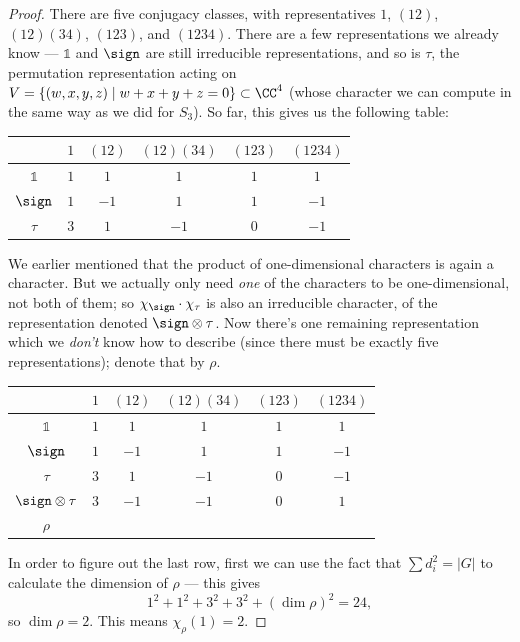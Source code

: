 \begin{proof}
There are five conjugacy classes, with representatives $1$, $(12)$, $(12)(34)$, $(123)$, and $(1234)$. There are a few representations we already know --- $\mathds{1}$ and $\sign$ are still irreducible representations, and so is $\tau$, the permutation representation acting on  $V = \{(w, x, y, z) \mid w + x + y + z = 0\} \subset \CC^4$ (whose character we can compute in the same way as we did for $S_3$). So far, this gives us the following table: 
\begin{center}
    \begin{tabular}{c||c|c|c|c|c}
    & $1$ & $(12)$ & $(12)(34)$ & $(123)$ & $(1234)$ \\
    \hline 
    \hline 
    $\mathds{1}$ & $1$ & $1$ & $1$ & $1$ & $1$ \\ 
    \hline 
    $\sign$ & $1$ & $-1$ & $1$ & $1$ & $-1$ \\
    \hline 
    $\tau$ & $3$ & $1$ & $-1$ & $0$ & $-1$
    \end{tabular}
\end{center}
We earlier mentioned that the product of one-dimensional characters is again a character. But we actually only need \emph{one} of the characters to be one-dimensional, not both of them; so $\chi_{\sign}\cdot \chi_{\tau}$ is also an irreducible character, of the representation denoted $\sign \otimes \tau$. Now there's one remaining representation which we \emph{don't} know how to describe (since there must be exactly five representations); denote that by $\rho$. 
\begin{center}
    \begin{tabular}{c||c|c|c|c|c}
    & $1$ & $(12)$ & $(12)(34)$ & $(123)$ & $(1234)$ \\
    \hline 
    \hline 
    $\mathds{1}$ & $1$ & $1$ & $1$ & $1$ & $1$ \\ 
    \hline 
    $\sign$ & $1$ & $-1$ & $1$ & $1$ & $-1$ \\
    \hline 
    $\tau$ & $3$ & $1$ & $-1$ & $0$ & $-1$ \\
    \hline 
    $\sign \otimes \tau$ & $3$ & $-1$ & $-1$ & $0$ & $1$ \\
    \hline 
    $\rho$ & & & & & 
    \end{tabular}
\end{center}
In order to figure out the last row, first we can use the fact that $\sum d_i^2 = |G|$ to calculate the dimension of $\rho$ --- this gives \[1^2 + 1^2 + 3^2 + 3^2 + (\dim \rho)^2 = 24,\] so $\dim \rho = 2$. This means $\chi_\rho(1) = 2$. 

\end{proof}
